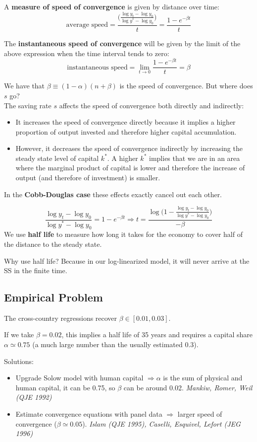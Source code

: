 A \textbf{measure of speed of convergence} is given by distance over time: \[
    \text{average speed} = \frac{\Big(\frac{\log y_t - \log y_0}{\log y^*-\log y_0}\Big)}{t} = \frac{1-e^{-\beta t}}{t}
\]

The \textbf{instantaneous speed of convergence} will be given by the limit of the above expression when the time interval tends to zero: \[
    \text{instantaneous speed} = \lim_{t \to 0}\frac{1-e^{-\beta t}}{t}= \beta
\]

We have that $\beta \equiv (1-\alpha)(n+\beta)$ is the speed of convergence. But where does $s$ go? \\
The saving rate $s$ affects the speed of convergence both directly and indirectly: \begin{itemize}
    \item It increases the speed of convergence directly because it implies a higher proportion of output invested and therefore higher capital accumulation.
    \item However, it decreases the speed of convergence indirectly by increasing the steady state level of capital $k^*$. A higher $k^*$ implies that we are in an area where the marginal product of capital is lower and therefore the increase of output (and therefore of investment) is smaller.
\end{itemize}
In the \textbf{Cobb-Douglas case} these effects exactly cancel out each other.

\[
    \frac{\log y_t - \log y_0}{\log y^*-\log y_0} = 1-e^{-\beta t} \Longrightarrow t=\frac{\log\Big(1-\frac{\log y_t - \log y_0}{\log y^* - \log y_0}\Big)}{-\beta}
\]
We use \textbf{half life} to measure how long it takes for the economy to cover half of the distance to the steady state.
\begin{remark*}
    Why use half life? Because in our log-linearized model, it will never arrive at the SS in the finite time.
\end{remark*}


\subsection{Empirical Problem}
The cross-country regressions recover $\beta \in [0.01, 0.03]$.

If we take $\beta = 0.02$, this implies a half life of 35 years and requires a capital share $\alpha \simeq 0.75$ (a much large number than the usually estimated $0.3$).

Solutions: \begin{itemize}
    \item Upgrade Solow model with human capital $\Rightarrow \alpha$ is the sum of physical and human capital, it can be 0.75, so $\beta$ can be around 0.02. \textit{Mankiw, Romer, Weil (QJE 1992)}
    \item Estimate convergence equations with panel data $\Rightarrow$ larger speed of convergence ($\beta \simeq 0.05$). \textit{Islam (QJE 1995), Caselli, Esquivel, Lefort (JEG 1996)}
\end{itemize}


